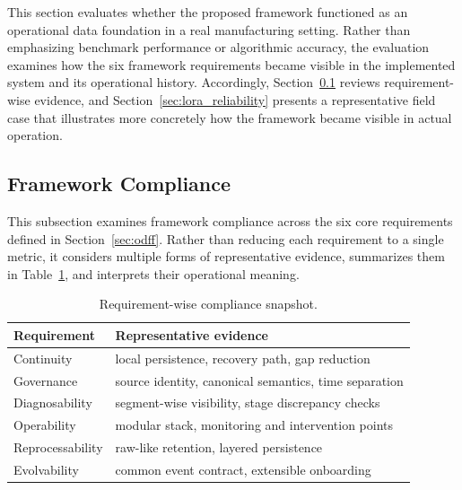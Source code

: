 \documentclass[systems,article,submit,pdftex,moreauthors]{Definitions/mdpi}
\begin{document}
This section evaluates whether the proposed framework functioned as an operational data foundation in a real manufacturing setting. Rather than emphasizing benchmark performance or algorithmic accuracy, the evaluation examines how the six framework requirements became visible in the implemented system and its operational history. Accordingly, Section~\ref{sec:framework_compliance} reviews requirement-wise evidence, and Section~\ref{sec:lora_reliability} presents a representative field case that illustrates more concretely how the framework became visible in actual operation.


\subsection{Framework Compliance}
\label{sec:framework_compliance}

This subsection examines framework compliance across the six core requirements defined in Section~\ref{sec:odff}. Rather than reducing each requirement to a single metric, it considers multiple forms of representative evidence, summarizes them in Table~\ref{tab:requirement_compliance_snapshot}, and interprets their operational meaning.


\begin{table}[H]
\caption{Requirement-wise compliance snapshot.\label{tab:requirement_compliance_snapshot}}
\renewcommand{\arraystretch}{1.25}
\begin{tabularx}{\textwidth}{
>{\raggedright\arraybackslash}p{}
>{\raggedright\arraybackslash}X}
\toprule
\textbf{Requirement} & \textbf{Representative evidence} \\
\midrule

Continuity
& local persistence, recovery path, gap reduction \\

Governance
& source identity, canonical semantics, time separation \\

Diagnosability
& segment-wise visibility, stage discrepancy checks \\

Operability
& modular stack, monitoring and intervention points \\

Reprocessability
& raw-like retention, layered persistence \\

Evolvability
& common event contract, extensible onboarding \\

\bottomrule
\end{tabularx}
\renewcommand{\arraystretch}{1.0}
\end{table}
\end{document}
